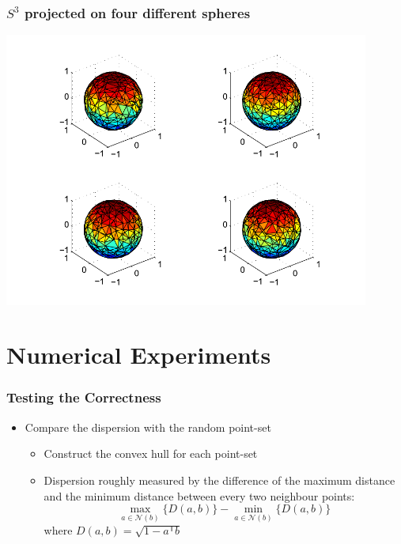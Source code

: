 \documentclass[serif]{beamer} %
\begin{document}
\begin{frame}
  \frametitle{$S^3$ projected on four different spheres}
  \centerline{\includegraphics[width=0.9\textwidth]{res_proj.pdf}}
\end{frame}



\section{Numerical Experiments}

\begin{frame}
  \frametitle{Testing the Correctness}
  \begin{itemize}
    \item Compare the dispersion with the random point-set
    \begin{itemize}
      \item Construct the convex hull for each point-set
      \item Dispersion roughly measured by the difference of the maximum distance and the minimum distance between every two neighbour points: 
\[
      \max_{a \in \mathcal{N}(b)} \{D(a,b)\} - 
        \min_{a \in \mathcal{N}(b)} \{ D(a, b) \}  
\]
      where $D(a,b) = \sqrt{1 - a^\mathsf{T} b}$
    \end{itemize}
  \end{itemize}
\end{frame}
\end{document}
